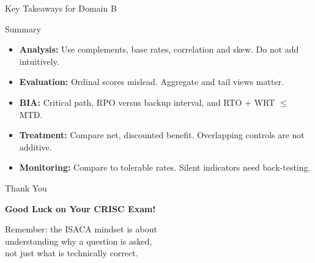 \documentclass[aspectratio=169]{beamer}
\begin{document}
	\begin{frame}{Key Takeaways for Domain B}
		\begin{block}{Summary}
			\begin{itemize}
				\item \textbf{Analysis:} Use complements, base rates, correlation and skew. Do not add intuitively.
				\item \textbf{Evaluation:} Ordinal scores mislead. Aggregate and tail views matter.
				\item \textbf{BIA:} Critical path, RPO versus backup interval, and RTO $+$ WRT $\leq$ MTD.
				\item \textbf{Treatment:} Compare net, discounted benefit. Overlapping controls are not additive.
				\item \textbf{Monitoring:} Compare to tolerable rates. Silent indicators need back-testing.
			\end{itemize}
		\end{block}
	\end{frame}
	
	\begin{frame}{Thank You}
		\begin{center}
			{\Huge \textbf{Good Luck on Your CRISC Exam!}}
			
			\vspace{1cm}
			
			Remember: the ISACA mindset is about\\
			understanding why a question is asked,\\
			not just what is technically correct.
		\end{center}
	\end{frame}
	
\end{document}
